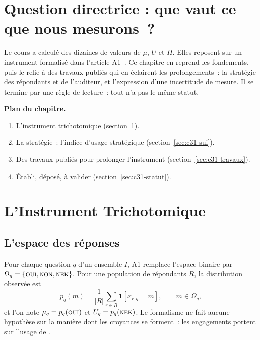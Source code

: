 \bigskip

\section*{Question directrice : que vaut ce que nous mesurons~?}

Le cours a calculé des dizaines de valeurs de $\mu$, $U$ et $H$. Elles
reposent sur un instrument formalisé dans l'article A1~\cite{minka2026nek}.
Ce chapitre en reprend les fondements, puis le relie à des travaux publiés
qui en éclairent les prolongements~: la stratégie des répondants et de
l'auditeur, et l'expression d'une incertitude de mesure. Il se termine par
une règle de lecture~: tout n'a pas le même statut.

\medskip
\textbf{Plan du chapitre.}
\begin{enumerate}
    \item L'instrument trichotomique (section~\ref{sec:c31-instrument}).
    \item La stratégie~: l'indice d'usage stratégique (section~\ref{sec:c31-sui}).
    \item Des travaux publiés pour prolonger l'instrument (section~\ref{sec:c31-travaux}).
    \item Établi, déposé, à valider (section~\ref{sec:c31-statut}).
\end{enumerate}

\separateur

\section{L'Instrument Trichotomique}
\label{sec:c31-instrument}

\subsection{L'espace des réponses}

Pour chaque question $q$ d'un ensemble $I$, A1 remplace l'espace binaire
par $\Omega_q = \{\textsc{oui}{}, \textsc{non}{}, \textsc{nek}{}\}$. Pour une population de
répondants $R$, la distribution observée est
\[
    p_q(m) = \frac{1}{|R|} \sum_{r \in R} \mathbf{1}[x_{r,q} = m],
    \qquad m \in \Omega_q,
\]
et l'on note $\mu_q = p_q(\textsc{oui}{})$ et $U_q = p_q(\textsc{nek}{})$. Le formalisme ne
fait aucune hypothèse sur la manière dont les croyances se forment~: les
engagements portent sur l'usage de \NEK{}.

